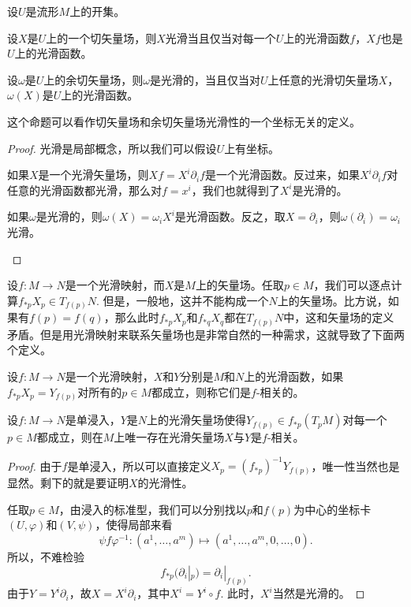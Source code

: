 \begin{pro}设$U$是流形$M$上的开集。
\begin{compactenum}
\item 设$X$是$U$上的一个切矢量场，则$X$光滑当且仅当对每一个$U$上的光滑函数$f$，$Xf$也是$U$上的光滑函数。
\item 设$\omega$是$U$上的余切矢量场，则$\omega$是光滑的，当且仅当对$U$上任意的光滑切矢量场$X$，$\omega(X)$是$U$上的光滑函数。
\end{compactenum}
\end{pro}

这个命题可以看作切矢量场和余切矢量场光滑性的一个坐标无关的定义。

\begin{proof}
光滑是局部概念，所以我们可以假设$U$上有坐标。
\begin{compactenum}
\item 如果$X$是一个光滑矢量场，则$Xf=X^i\partial_if$是一个光滑函数。反过来，如果$X^i\partial_if$对任意的光滑函数都光滑，那么对$f=x^i$，我们也就得到了$X^i$是光滑的。
\item 如果$\omega$是光滑的，则$\omega(X)=\omega_iX^i$是光滑函数。反之，取$X=\partial_i$，则$\omega(\partial_i)=\omega_i$光滑。
\end{compactenum}
\end{proof}

设$f:M\to N$是一个光滑映射，而$X$是$M$上的矢量场。任取$p\in M$，我们可以逐点计算$f_{*p}X_p\in T_{f(p)}N$. 但是，一般地，这并不能构成一个$N$上的矢量场。比方说，如果有$f(p)=f(q)$，那么此时$f_{*p}X_p$和$f_{*q}X_q$都在$T_{f(p)}N$中，这和矢量场的定义矛盾。但是用光滑映射来联系矢量场也是非常自然的一种需求，这就导致了下面两个定义。

\begin{para}
设$f:M\to N$是一个光滑映射，$X$和$Y$分别是$M$和$N$上的光滑函数，如果$f_{*p}X_p=Y_{f(p)}$对所有的$p\in M$都成立，则称它们是$f$-相关的。
\end{para}

\begin{pro}\label{pro:3.5}
设$f:M\to N$是单浸入，$Y$是$N$上的光滑矢量场使得$Y_{f(p)}\in f_{*p}(T_pM)$对每一个$p\in M$都成立，则在$M$上唯一存在光滑矢量场$X$与$Y$是$f$-相关。
\end{pro}

\begin{proof}
由于$f$是单浸入，所以可以直接定义$X_p=(f_{*p})^{-1}Y_{f(p)}$，唯一性当然也是显然。剩下的就是要证明$X$的光滑性。

任取$p\in M$，由浸入的标准型，我们可以分别找以$p$和$f(p)$为中心的坐标卡$(U,\varphi)$和$(V,\psi)$，使得局部来看
\[
	\psi f\varphi^{-1}:(a^1,\dots,a^m)\mapsto (a^1,\dots,a^m,0,\dots,0).
\]
所以，不难检验
\[
	f_{*p}(\partial_i|_p)=\partial_i|_{f(p)}.
\]
由于$Y=Y^i\partial_i$，故$X=X^i\partial_i$，其中$X^i=Y^i\circ f$. 此时，$X^i$当然是光滑的。
\end{proof}

